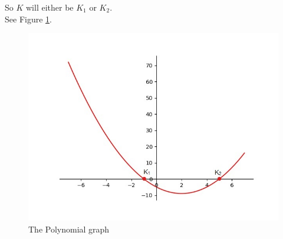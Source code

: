 \documentclass[journal,12pt,twocolumn]{article}\usepackage[margin=1.25 in]{geometry}
\begin{document}
\begin{flushleft}
So $K$ will either be $K_1$ or $K_2$.\\
See Figure
	  \ref{InkedFigure_1_py_LI.jpg}.
  \begin{figure}
	  \centering 
	  \includegraphics[width=\columnwidth]{InkedFigure_1_py_LI.jpg}
	  \caption{The Polynomial graph}
	  \label{InkedFigure_1_py_LI.jpg}
	  \end{figure}
\end{flushleft}
\end{document}

